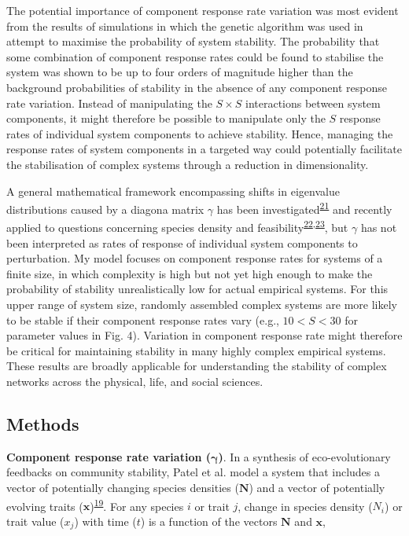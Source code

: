 \documentclass[]{article}
\begin{document}
The potential importance of component response rate variation was most
evident from the results of simulations in which the genetic algorithm
was used in attempt to maximise the probability of system stability. The
probability that some combination of component response rates could be
found to stabilise the system was shown to be up to four orders of
magnitude higher than the background probabilities of stability in the
absence of any component response rate variation. Instead of
manipulating the \(S \times S\) interactions between system components,
it might therefore be possible to manipulate only the \(S\) response
rates of individual system components to achieve stability. Hence,
managing the response rates of system components in a targeted way could
potentially facilitate the stabilisation of complex systems through a
reduction in dimensionality.

A general mathematical framework encompassing shifts in eigenvalue
distributions caused by a diagona matrix \(\gamma\) has been
investigated\textsuperscript{\protect\hyperlink{ref-Ahmadian2015}{21}}
and recently applied to questions concerning species density and
feasibility\textsuperscript{\protect\hyperlink{ref-Gibbs2017}{22},\protect\hyperlink{ref-Stone2017}{23}},
but \(\gamma\) has not been interpreted as rates of response of
individual system components to perturbation. My model focuses on
component response rates for systems of a finite size, in which
complexity is high but not yet high enough to make the probability of
stability unrealistically low for actual empirical systems. For this
upper range of system size, randomly assembled complex systems are more
likely to be stable if their component response rates vary (e.g.,
\(10 < S < 30\) for parameter values in Fig. 4). Variation in component
response rate might therefore be critical for maintaining stability in
many highly complex empirical systems. These results are broadly
applicable for understanding the stability of complex networks across
the physical, life, and social sciences.

\subsection{Methods}\label{methods}

\textbf{Component response rate variation (\(\mathbf{\gamma}\))}. In a
synthesis of eco-evolutionary feedbacks on community stability, Patel et
al. model a system that includes a vector of potentially changing
species densities (\(\mathbf{N}\)) and a vector of potentially evolving
traits
(\(\mathbf{x}\))\textsuperscript{\protect\hyperlink{ref-Patel2018}{19}}.
For any species \(i\) or trait \(j\), change in species density
(\(N_{i}\)) or trait value (\(x_{j}\)) with time (\(t\)) is a function
of the vectors \(\mathbf{N}\) and \(\mathbf{x}\),
\end{document}
